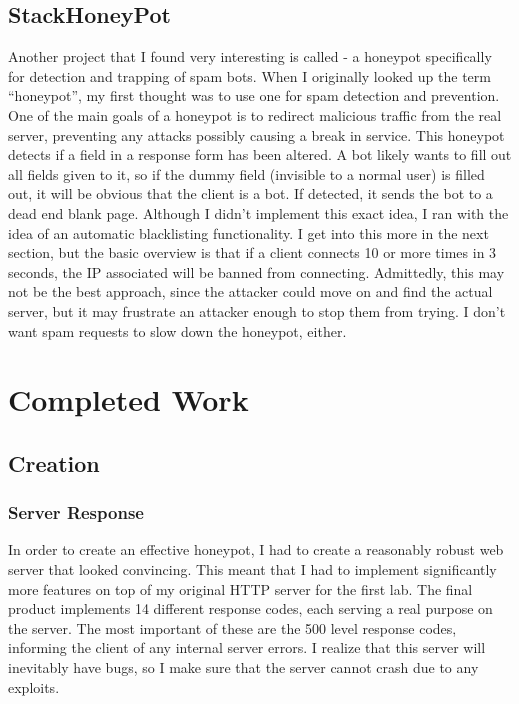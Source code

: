 \documentclass[12pt]{article}
\begin{document}
\subsection{StackHoneyPot}
Another project that I found very interesting is called  - a honeypot specifically for detection and trapping of spam bots.
When I originally looked up the term ``honeypot'', my first thought was to use one for spam detection and prevention.
One of the main goals of a honeypot is to redirect malicious traffic from the real server, preventing any attacks possibly causing a break in service.
This honeypot detects if a field in a response form has been altered.
A bot likely wants to fill out all fields given to it, so if the dummy field (invisible to a normal user) is filled out, it will be obvious that the client is a bot.
If detected, it sends the bot to a dead end blank page.
Although I didn't implement this exact idea, I ran with the idea of an automatic blacklisting functionality.
I get into this more in the next section, but the basic overview is that if a client connects 10 or more times in 3 seconds, the IP associated will be banned from connecting.
Admittedly, this may not be the best approach, since the attacker could move on and find the actual server, but it may frustrate an attacker enough to stop them from trying.
I don't want spam requests to slow down the honeypot, either.


\section{Completed Work}

\subsection{Creation}

\subsubsection{Server Response}
In order to create an effective honeypot, I had to create a reasonably robust web server that looked convincing.
This meant that I had to implement significantly more features on top of my original HTTP server for the first lab.
The final product implements 14 different response codes, each serving a real purpose on the server.
The most important of these are the 500 level response codes, informing the client of any internal server errors.
I realize that this server will inevitably have bugs, so I make sure that the server cannot crash due to any exploits.
\end{document}
